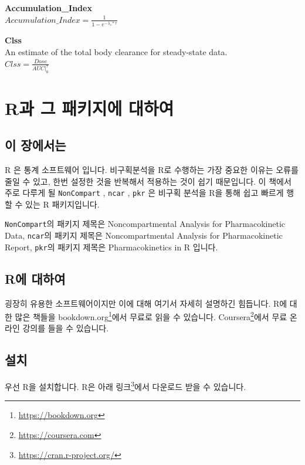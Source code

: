 \documentclass[
  10pt,
]{krantz}
\begin{document}
\textbf{Accumulation\_Index}\\
\(Accumulation\_Index = \frac{1}{1-e^{-\lambda_{z}*\tau}}\)

\textbf{Clss}\\
An estimate of the total body clearance for steady-state data.\\
\(Clss = \frac{Dose}{AUC|_{0}^{\tau}}\)

\hypertarget{R-and-packages}{%
\chapter{R과 그 패키지에 대하여}\label{R-and-packages}}

\hypertarget{summary-r-packages}{%
\section{이 장에서는}\label{summary-r-packages}}

R \citep{R-base}은 통계 소프트웨어 입니다.
비구획분석을 R로 수행하는 가장 중요한 이유는 오류를 줄일 수 있고, 한번 설정한 것을 반복해서 적용하는 것이 쉽기 때문입니다.
이 책에서 주로 다루게 될 \texttt{NonCompart} \citep{R-NonCompart}, \texttt{ncar} \citep{R-ncar}, \texttt{pkr} \citep{R-pkr} 은 비구획 분석을 R을 통해 쉽고 빠르게 행할 수 있는 R 패키지입니다.

\texttt{NonCompart}의 패키지 제목은 Noncompartmental Analysis for Pharmacokinetic Data,
\texttt{ncar}의 패키지 제목은 Noncompartmental Analysis for Pharmacokinetic Report,
\texttt{pkr}의 패키지 제목은 Pharmacokinetics in R 입니다.

\hypertarget{basic}{%
\section{R에 대하여}\label{basic}}

굉장히 유용한 소프트웨어이지만 이에 대해 여기서 자세히 설명하긴 힘듭니다.
R에 대한 많은 책들을 bookdown.org\footnote{\url{https://bookdown.org}}에서 무료로 읽을 수 있습니다.
Coursera\footnote{\url{https://coursera.com}}에서 무료 온라인 강의를 들을 수 있습니다.

\hypertarget{install}{%
\section{설치}\label{install}}

우선 R을 설치합니다.
R은 아래 링크\footnote{\url{https://cran.r-project.org/}}에서 다운로드 받을 수 있습니다.
\end{document}
